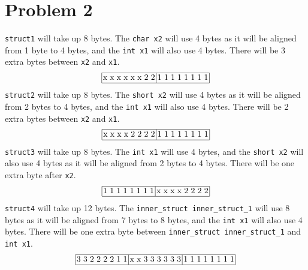 \section*{Problem 2}
\texttt{struct1} will take up 8 bytes. The \texttt{char x2} will use 4 bytes as it will be aligned from 1 byte to 4 bytes, and the \texttt{int x1} will also use 4 bytes. There will be 3 extra bytes between \texttt{x2} and \texttt{x1}.
\[\arraycolsep=1.5pt%
\begin{array}{|cccccccc|cccccccc|}\hline
	\text{x} & \text{x} & \text{x} & \text{x} & \text{x} & \text{x} & 2 & 2 & 1 & 1 & 1 & 1 & 1 & 1 & 1 & 1 \\ \hline
\end{array}
\]
\texttt{struct2} will take up 8 bytes. The \texttt{short x2} will use 4 bytes as it will be aligned from 2 bytes to 4 bytes, and the \texttt{int x1} will also use 4 bytes. There will be 2 extra bytes between \texttt{x2} and \texttt{x1}.
\[\arraycolsep=1.5pt%
\begin{array}{|cccccccc|cccccccc|}\hline
	\text{x} & \text{x} & \text{x} & \text{x} & 2 & 2 & 2 & 2 & 1 & 1 & 1 & 1 & 1 & 1 & 1 & 1 \\ \hline
\end{array}
\]
\texttt{struct3} will take up 8 bytes. The \texttt{int x1} will use 4 bytes, and the \texttt{short x2} will also use 4 bytes as it will be aligned from 2 bytes to 4 bytes. There will be one extra byte after \texttt{x2}.
\[\arraycolsep=1.5pt%
\begin{array}{|cccccccc|cccccccc|}\hline
	1 & 1 & 1 & 1 & 1 & 1 & 1 & 1 & \text{x} & \text{x} & \text{x} & \text{x} & 2 & 2 & 2 & 2 \\ \hline
\end{array}
\]
\texttt{struct4} will take up 12 bytes. The \texttt{inner\_struct inner\_struct\_1} will use 8 bytes as it will be aligned from 7 bytes to 8 bytes, and the \texttt{int x1} will also use 4 bytes. There will be one extra byte between \texttt{inner\_struct inner\_struct\_1} and \texttt{int x1}.
\[\arraycolsep=1.5pt%
\begin{array}{|cccccccc|cccccccc|cccccccc|}\hline
	3 & 3 & 2 & 2 & 2 & 2 & 1 & 1 & \text{x} & \text{x} & 3 & 3 & 3 & 3 & 3 & 3 & 1 & 1 & 1 & 1 & 1 & 1 & 1 & 1 \\ \hline
\end{array}
\]
